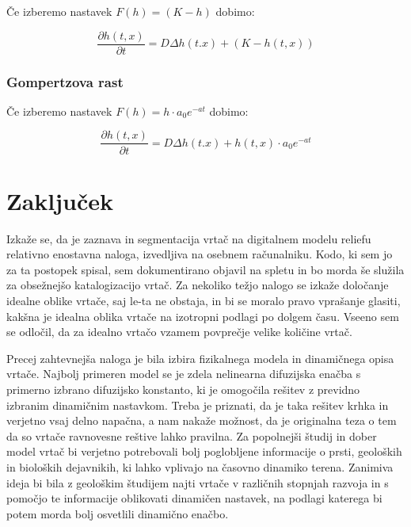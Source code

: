 \documentclass[a4paper, oneside, 12pt]{book}
\begin{document}
          Če izberemo nastavek $F(h) = (K - h)$ dobimo:

            \begin{equation}
              \frac{ \partial h(t,x) }{ \partial t} = D \Delta h(t.x) + (K - h(t,x))
              \label{difuzija-omejena-eksponentna-rast}
            \end{equation}

          \subsection{Gompertzova rast}

          Če izberemo nastavek $F(h) = h \cdot a_0 e^{-a t}$ dobimo:

            \begin{equation}
              \frac{ \partial h(t,x) }{ \partial t} = D \Delta h(t.x) + h(t,x) \cdot a_0 e^{-a t}
              \label{difuzija-gompertzova-rast}
            \end{equation}

            \chapter{Zaključek}

            Izkaže se, da je zaznava in segmentacija vrtač na digitalnem modelu reliefu relativno enostavna naloga, izvedljiva na osebnem računalniku. Kodo, ki sem jo za ta postopek spisal, sem dokumentirano objavil na spletu in bo morda še služila za obsežnejšo katalogizacijo vrtač.
            Za nekoliko težjo nalogo se izkaže določanje idealne oblike vrtače, saj le-ta ne obstaja, in bi se moralo pravo vprašanje glasiti, kakšna je idealna oblika vrtače na izotropni podlagi po dolgem času. Vseeno sem se odločil, da za idealno vrtačo vzamem povprečje velike količine vrtač.

            Precej zahtevnejša naloga je bila izbira fizikalnega modela in dinamičnega opisa vrtače. Najbolj primeren model se je zdela nelinearna difuzijska enačba s primerno izbrano difuzijsko konstanto, ki je omogočila rešitev z previdno izbranim dinamičnim nastavkom. Treba je priznati, da je taka rešitev krhka in verjetno vsaj delno napačna, a nam nakaže možnost, da je originalna teza o tem da so vrtače ravnovesne reštive lahko pravilna.
            Za popolnejši študij in dober model vrtač bi verjetno potrebovali bolj poglobljene informacije o prsti, geoloških in bioloških dejavnikih, ki lahko vplivajo na časovno dinamiko terena. Zanimiva ideja bi bila z geološkim študijem najti vrtače v različnih stopnjah razvoja in s pomočjo te informacije oblikovati dinamičen nastavek, na podlagi katerega bi potem morda bolj osvetlili dinamično enačbo.

            \nocite{*}
            \newpage
            {}
            


            
\end{document}
